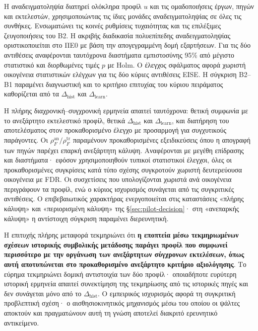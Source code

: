 \documentclass[11pt,a4paper]{article}
\begin{document}
Η αναδειγματοληψία διατηρεί ολόκληρα προφίλ $u$ και τις ομαδοποιήσεις έργων, πηγών και εκτελεστών, χρησιμοποιώντας τις ίδιες μονάδες αναδειγματοληψίας σε όλες τις συνθήκες. Ενσωματώνει τις κοινές ρυθμίσεις τυχαιότητας και τις επιλέξιμες ζευγοποιήσεις του B2. Η ακριβής διαδικασία πολυεπίπεδης αναδειγματοληψίας οριστικοποιείται στο ΠΕ0 με βάση την απογεγραμμένη δομή εξαρτήσεων. Για τις δύο αντιθέσεις αναφέρονται ταυτόχρονα διαστήματα εμπιστοσύνης 95\% από μέγιστο στατιστικό και διορθωμένες τιμές $p$ με Holm. Ο έλεγχος σφάλματος αφορά χωριστή οικογένεια στατιστικών ελέγχων για τις δύο κύριες αντιθέσεις EISE. Η σύγκριση B2--B1 παραμένει διαγνωστική και το κριτήριο επιτυχίας του κύριου πειράματος καθορίζεται από τα $\Delta_{\mathrm{hist}}$ και $\Delta_{\mathrm{learn}}$.

Η πλήρης διαχρονική--συγχρονική ερμηνεία απαιτεί ταυτόχρονα: θετική συμφωνία με το ανεξάρτητο εκτελεστικό προφίλ, θετικά $\Delta_{\mathrm{hist}}$ και $\Delta_{\mathrm{learn}}$, και διατήρηση του αποτελέσματος στον προκαθορισμένο έλεγχο με προσαρμογή για συγχυτικούς παράγοντες. Οι $\rho_F^{\mathrm{an}}/\rho_F^{\mathrm{tr}}$ παραμένουν προκαθορισμένες εξειδικεύσεις όπου η απογραφή των πηγών παρέχει επαρκή ανεξάρτητη κάλυψη. Αναφέρονται με μεγέθη επίδρασης και διαστήματα· εφόσον χρησιμοποιηθούν τυπικοί στατιστικοί έλεγχοι, όλες οι προκαθορισμένες συγκρίσεις κατά τύπο σχέσης συγκροτούν χωριστή δευτερεύουσα οικογένεια με FDR. Οι συσχετίσεις που υπολογίζονται χωριστά ανά οικογένεια περιγράφουν τα προφίλ, ενώ ο κύριος ισχυρισμός συνάγεται από τις συγκριτικές αντιθέσεις. Ο επιβεβαιωτικός χαρακτήρας ενεργοποιείται στις καταστάσεις «πλήρης κάλυψη» και «περιορισμένη κάλυψη» της \S\ref{sec:pilot-decision}· στη «ανεπαρκής κάλυψη» η αντίστοιχη σύγκριση παραμένει διερευνητική.

Η επιτυχής πλήρης μεταφορά τεκμηριώνει ότι \textbf{η εποπτεία μέσω τεκμηριωμένων σχέσεων ιστορικής συμβολικής μετάδοσης παράγει προφίλ που συμφωνεί περισσότερο με την οργάνωση των ανεξάρτητων σύγχρονων εκτελέσεων, όπως αυτή αποτυπώνεται στο προκαθορισμένο ανεξάρτητο κριτήριο αξιολόγησης}. Το εύρημα τεκμηριώνει δομική αντιστοιχία των δύο προφίλ· οποιαδήποτε ευρύτερη ιστορική ερμηνεία απαιτεί συνεκτίμηση της τεκμηρίωσης από τις ιστορικές πηγές και δεν συνάγεται μόνο από το $\Delta_{\mathrm{hist}}$. Ο εμπειρικός ισχυρισμός αφορά τη συγκριτική προβλεπτική σχέση· ο αισθησιοκινητικός μηχανισμός μέσω του οποίου οι ψάλτες αποκτούν και πραγματώνουν αυτή τη γνώση αποτελεί διακριτό ερευνητικό αντικείμενο.
\end{document}
